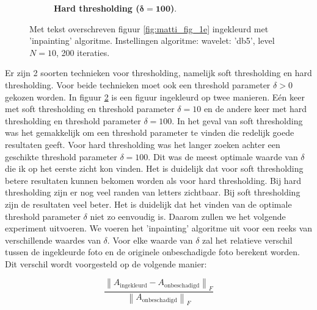 \begin{figure}[!]
\begin{subfigure}[b]{0.4\textwidth}
        \caption{ \textbf{Hard thresholding ($\mathbf{\delta = 100 }$)}.}
        \label{fig:matti_hard_2}
    \end{subfigure}
    \caption{Met tekst overschreven figuur \ref{fig:matti_fig_1e} ingekleurd met 'inpainting' algoritme. Instellingen algoritme: wavelet: 'db5', level $N = 10$, 200 iteraties.}\label{fig:matti_hardsoft}
\end{figure}



Er zijn 2 soorten technieken voor thresholding, namelijk soft thresholding en hard thresholding. Voor beide technieken moet ook een threshold parameter $\delta > 0$ gekozen worden. In figuur \ref{fig:matti_hardsoft} is een figuur ingekleurd op twee manieren. E\'{e}n keer met soft thresholding en threshold parameter $\delta = 10$ en de andere keer met hard thresholding en threshold parameter $\delta = 100$. In het geval van soft thresholding was het gemakkelijk om een threshold parameter te vinden die redelijk goede resultaten geeft. Voor hard thresholding was het langer zoeken achter een geschikte threshold parameter $\delta = 100$. Dit was de meest optimale waarde van $\delta$ die ik op het eerste zicht kon vinden. Het is duidelijk dat voor soft thresholding betere resultaten kunnen bekomen worden als voor hard thresholding. Bij hard thresholding zijn er nog veel randen van letters zichtbaar. Bij soft thresholding zijn de resultaten veel beter. 
\newline
\newline
Het is duidelijk dat het vinden van de optimale threshold parameter $\delta$ niet zo eenvoudig is. Daarom zullen we het volgende experiment uitvoeren. We voeren het 'inpainting' algoritme uit voor een reeks van verschillende waardes van $\delta$. Voor elke waarde van $\delta$ zal het relatieve verschil tussen de ingekleurde foto en de originele onbeschadigde foto berekent worden. Dit verschil wordt voorgesteld op de volgende manier:

\begin{equation} \label{eq:matti_eq1}
\frac{\left\lVert A_{\text{ingekleurd}} - A_{\text{onbeschadigd}} \right\rVert_{F}}{\left\lVert A_{\text{onbeschadigd}} \right\rVert_{F}}
\end{equation}

